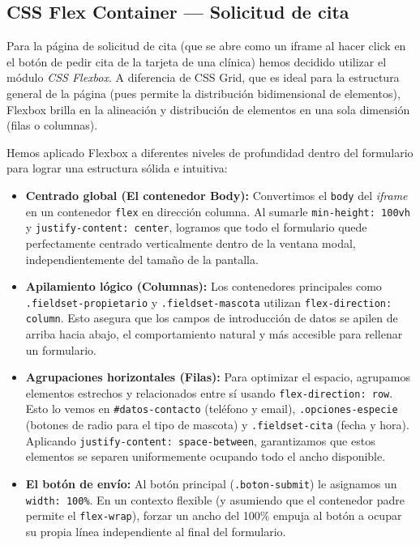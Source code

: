 \documentclass[11pt]{article}
\begin{document}
\subsection{CSS Flex Container --- Solicitud de cita}

Para la página de solicitud de cita (que se abre como un iframe al hacer click en el botón de pedir cita de la tarjeta de una clínica) hemos decidido utilizar el módulo \textit{CSS Flexbox}. A diferencia de CSS Grid, que es ideal para la estructura general de la página (pues permite la distribución bidimensional de elementos), Flexbox brilla en la alineación y distribución de elementos en una sola dimensión (filas o columnas).

Hemos aplicado Flexbox a diferentes niveles de profundidad dentro del formulario para lograr una estructura sólida e intuitiva:

\begin{itemize}
\item \textbf{Centrado global (El contenedor Body):} Convertimos el \texttt{body} del \textit{iframe} en un contenedor \texttt{flex} en dirección columna. Al sumarle \texttt{min-height: 100vh} y \texttt{justify-content: center}, logramos que todo el formulario quede perfectamente centrado verticalmente dentro de la ventana modal, independientemente del tamaño de la pantalla.
\item \textbf{Apilamiento lógico (Columnas):} Los contenedores principales como \texttt{.fieldset-propietario} y \texttt{.fieldset-mascota} utilizan \texttt{flex-direction: column}. Esto asegura que los campos de introducción de datos se apilen de arriba hacia abajo, el comportamiento natural y más accesible para rellenar un formulario.
\item \textbf{Agrupaciones horizontales (Filas):} Para optimizar el espacio, agrupamos elementos estrechos y relacionados entre sí usando \texttt{flex-direction: row}. Esto lo vemos en \texttt{\#datos-contacto} (teléfono y email), \texttt{.opciones-especie} (botones de radio para el tipo de mascota) y \texttt{.fieldset-cita} (fecha y hora). Aplicando \texttt{justify-content: space-between}, garantizamos que estos elementos se separen uniformemente ocupando todo el ancho disponible.
\item \textbf{El botón de envío:} Al botón principal (\texttt{.boton-submit}) le asignamos un \texttt{width: 100\%}. En un contexto flexible (y asumiendo que el contenedor padre permite el \texttt{flex-wrap}), forzar un ancho del 100\% empuja al botón a ocupar su propia línea independiente al final del formulario.
\end{itemize}
\end{document}
